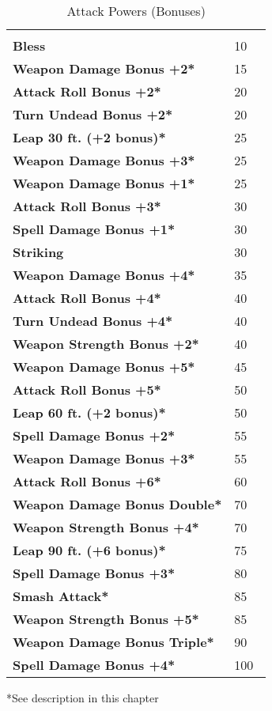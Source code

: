 \begin{multicols*}{2}
\begin {table}[H]
  \caption{Attack Powers (Bonuses)}
  \begin{tabularx}{\columnwidth}{>{\bfseries}YY}
   & \\
	Bless & 10\\
	Weapon Damage Bonus +2* & 15\\
	Attack Roll Bonus +2* & 20\\
	Turn Undead Bonus +2* & 20\\
	Leap 30 ft. (+2 bonus)* & 25\\
	Weapon Damage Bonus +3* & 25\\
	Weapon Damage Bonus +1* & 25\\
	Attack Roll Bonus +3* & 30\\
	Spell Damage Bonus +1* & 30\\
	Striking & 30\\
	Weapon Damage Bonus +4* & 35\\
	Attack Roll Bonus +4* & 40\\
	Turn Undead Bonus +4* & 40\\
	Weapon Strength Bonus +2* & 40\\
	Weapon Damage Bonus +5* & 45\\
	Attack Roll Bonus +5* & 50\\
	Leap 60 ft. (+2 bonus)* & 50\\
	Spell Damage Bonus +2* & 55\\
	Weapon Damage Bonus +3* & 55\\
	Attack Roll Bonus +6* & 60\\
	Weapon Damage Bonus Double* & 70\\
	Weapon Strength Bonus +4* & 70\\
	Leap 90 ft. (+6 bonus)* & 75\\
	Spell Damage Bonus +3* & 80\\
	Smash Attack* & 85\\
	Weapon Strength Bonus +5* & 85\\
	Weapon Damage Bonus Triple* & 90\\
	Spell Damage Bonus +4* & 100\
  \end {tabularx}
*See description in this chapter
\end {table}


\end{multicols*}
